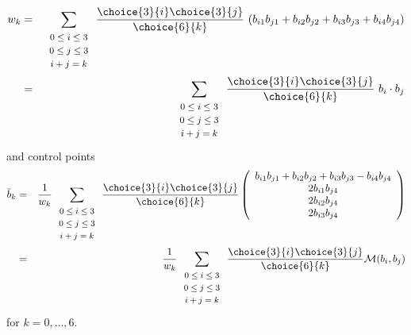 \documentclass[12pt]{article}
\begin{document}
\begin{eqnarray}
\label{eq:weights}
w_k & = & \sum_{\begin{array}{c} \mbox{\footnotesize{$0 \leq i \leq 3$}} \\ 
			     \mbox{\footnotesize{$0 \leq j \leq 3$}} \\ 
			     \mbox{\footnotesize{$i+j=k$}}
			     \end{array}}
        \frac{\choice{3}{i} \choice{3}{j}}{\choice{6}{k}}
	\ (b_{i1} b_{j1} + b_{i2} b_{j2} + b_{i3} b_{j3} + b_{i4} b_{j4}) \nonumber \\
& = & \sum_{\begin{array}{c} \mbox{\footnotesize{$0 \leq i \leq 3$}} \\ 
			     \mbox{\footnotesize{$0 \leq j \leq 3$}} \\ 
			     \mbox{\footnotesize{$i+j=k$}}
			     \end{array}}
        \frac{\choice{3}{i} \choice{3}{j}}{\choice{6}{k}}
	\ b_i \cdot b_j
\end{eqnarray}
and control points 
\begin{eqnarray}
\label{eq:control-pts}
\breve{b}_k & = & \frac{1}{w_k} 
      \sum_{\begin{array}{c} \mbox{\footnotesize{$0 \leq i \leq 3$}} \\ 
			     \mbox{\footnotesize{$0 \leq j \leq 3$}} \\ 
			     \mbox{\footnotesize{$i+j=k$}}
			     \end{array}} 
        \frac{\choice{3}{i} \choice{3}{j}}{\choice{6}{k}}
	\left( \begin{array}{c}
            b_{i1} b_{j1} + b_{i2} b_{j2} + b_{i3} b_{j3} - b_{i4} b_{j4} \\
            2b_{i1} b_{j4} \\
            2b_{i2} b_{j4} \\
            2b_{i3} b_{j4} 
	\end{array} \right) \nonumber \\
& = & \frac{1}{w_k} 
      \sum_{\begin{array}{c} \mbox{\footnotesize{$0 \leq i \leq 3$}} \\ 
			     \mbox{\footnotesize{$0 \leq j \leq 3$}} \\ 
			     \mbox{\footnotesize{$i+j=k$}}
			     \end{array}} 
        \frac{\choice{3}{i} \choice{3}{j}}{\choice{6}{k}}
{\cal M}(b_i, b_j)
\end{eqnarray}
for $k = 0, \ldots, 6$.
\end{document}
